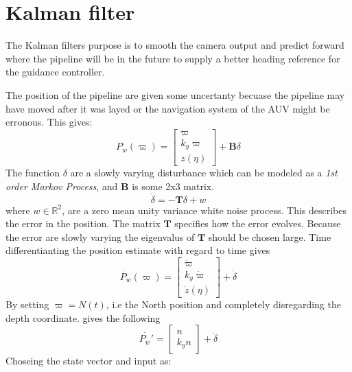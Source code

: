 	


\section{Kalman filter}
	The Kalman filters purpose is to smooth the camera output and predict forward where the pipeline will
	be in the future to supply a better heading reference for the guidance controller.

	The position of the pipeline are given some uncertanty becuase the pipeline may have moved after it
	was layed or the navigation system of the AUV might be erronous. This gives:
	\begin{equation}
		P_w(\varpi) = \left [ \begin{array}{c}
					\varpi \\
					k_y \varpi \\
					z(\eta)
				\end{array} \right ] + \mathbf{B}\delta
	\end{equation}
	The function $\delta$ are a slowly varying disturbance which can be modeled as a \textit{1st order Markov
	Process}, and $\mathbf{B}$ is some 2x3 matrix.
	\begin{equation}
		\dot{\delta} = -\mathbf{T} \delta +  w
	\end{equation}
	where $w \in \mathbb{R}^2$, are a zero mean unity variance white noise process. This describes the
	error in the position. The matrix $\mathbf{T}$ specifies how the error evolves. Because the error are
	slowly varying the eigenvalus of $\mathbf{T}$ should be chosen large. Time differentianting
	the position estimate with regard to time gives
	\begin{equation}
		\dot{P_w}(\varpi) =  \left [ \begin{array}{c}
						\dot{\varpi} \\
						k_y \dot{\varpi} \\
						\dot{z}(\eta)
					\end{array} \right ] + \dot{\delta}
	\end{equation}
	By setting $\varpi = N(t)$, i.e the North position and completely disregarding the depth coordinate.
	gives the following
	\begin{equation}
		\dot{P_w'} = \left [ \begin{array}{c}
					n \\
					k_y n 
				\end{array} \right ] + \dot{\delta}
	\end{equation}
	Choseing the state vector and input as:
